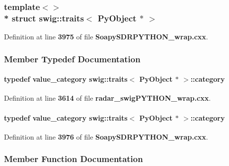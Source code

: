 \subsubsection*{template$<$$>$\\*
struct swig\+::traits$<$ Py\+Object $\ast$ $>$}



Definition at line {\bf 3975} of file {\bf Soapy\+S\+D\+R\+P\+Y\+T\+H\+O\+N\+\_\+wrap.\+cxx}.



\subsubsection{Member Typedef Documentation}
\paragraph[{category}]{\setlength{\rightskip}{0pt plus 5cm}typedef {\bf value\+\_\+category} {\bf swig\+::traits}$<$ Py\+Object $\ast$ $>$\+::{\bf category}}\label{structswig_1_1traits_3_01PyObject_01_5_01_4_a61e2b13476996b055b368fe035b84efc}


Definition at line {\bf 3614} of file {\bf radar\+\_\+swig\+P\+Y\+T\+H\+O\+N\+\_\+wrap.\+cxx}.

\paragraph[{category}]{\setlength{\rightskip}{0pt plus 5cm}typedef {\bf value\+\_\+category} {\bf swig\+::traits}$<$ Py\+Object $\ast$ $>$\+::{\bf category}}\label{structswig_1_1traits_3_01PyObject_01_5_01_4_a61e2b13476996b055b368fe035b84efc}


Definition at line {\bf 3976} of file {\bf Soapy\+S\+D\+R\+P\+Y\+T\+H\+O\+N\+\_\+wrap.\+cxx}.



\subsubsection{Member Function Documentation}
